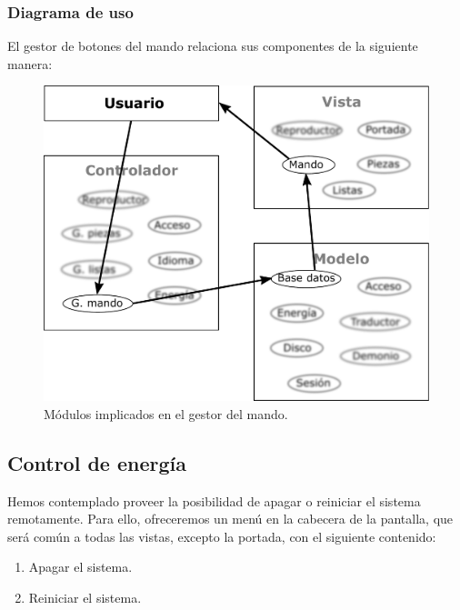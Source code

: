 \subsubsection{Diagrama de uso}

El gestor de botones del mando relaciona sus componentes de la siguiente manera:

\smallskip

\begin{figure}[H]
	\noindent \begin{centering}
		\includegraphics[width=\linewidth/2]{capitulo4/mvc_mando}
		\par\end{centering}
	\smallskip
	\caption{\label{fig:mvc_mando} Módulos implicados en el gestor del mando.}
\end{figure} 

\smallskip

\subsection{Control de energía}

Hemos contemplado proveer la posibilidad de apagar o reiniciar el sistema remotamente. Para ello, ofreceremos un menú en la cabecera de la pantalla, que será común a todas las vistas, excepto la portada, con el siguiente contenido:

\begin{enumerate}
	\item Apagar el sistema.
	\item Reiniciar el sistema.
\end{enumerate}


